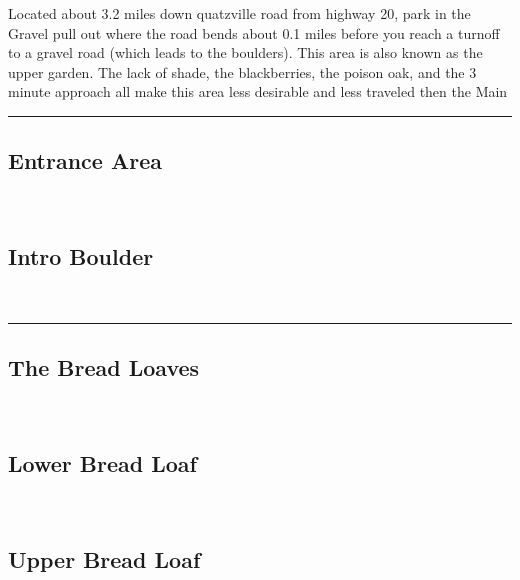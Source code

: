 \begin{multicols}{2}
\begin{minipage}{\columnwidth}
Located about 3.2 miles down quatzville road from highway 20, park in the Gravel pull out where the road bends about 0.1 miles before you reach a turnoff to a gravel road (which leads to the boulders). This area is also known as the upper garden. The lack of shade, the blackberries, the poison oak, and the 3 minute approach all make this area less desirable and less traveled then the Main
\end{minipage}

\end{multicols}
\rule{\textwidth}{1pt}
\begin{multicols}{2}
		\section{Entrance Area}\label{sa:Entrance Area}
	\begin{minipage}{\columnwidth}
	\
	\end{minipage}
			\subsection*{Intro Boulder}\label{bf:Intro Boulder}
			\begin{minipage}{\columnwidth}
			\
			\end{minipage}
			
\end{multicols}
\rule{\textwidth}{1pt}
\begin{multicols}{2}
		\section{The Bread Loaves}\label{sa:The Bread Loaves}
	\begin{minipage}{\columnwidth}
	\
	\end{minipage}
			\subsection*{Lower Bread Loaf}\label{bf:Lower Bread Loaf}
			\begin{minipage}{\columnwidth}
			\
			\end{minipage}
			
			\subsection*{Upper Bread Loaf}\label{bf:Upper Bread Loaf}
			\begin{minipage}{\columnwidth}
			\
			\end{minipage}
			
\end{multicols}
